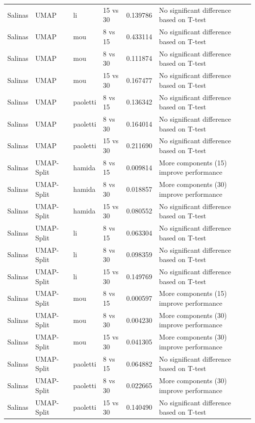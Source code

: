 \begin{longtable}{llllrl}
Salinas & UMAP & li & 15 vs 30 & 0.139786 & No significant difference based on T-test \\
Salinas & UMAP & mou & 8 vs 15 & 0.433114 & No significant difference based on T-test \\
Salinas & UMAP & mou & 8 vs 30 & 0.111874 & No significant difference based on T-test \\
Salinas & UMAP & mou & 15 vs 30 & 0.167477 & No significant difference based on T-test \\
Salinas & UMAP & paoletti & 8 vs 15 & 0.136342 & No significant difference based on T-test \\
Salinas & UMAP & paoletti & 8 vs 30 & 0.164014 & No significant difference based on T-test \\
Salinas & UMAP & paoletti & 15 vs 30 & 0.211690 & No significant difference based on T-test \\
Salinas & UMAP-Split & hamida & 8 vs 15 & 0.009814 & More components (15) improve performance \\
Salinas & UMAP-Split & hamida & 8 vs 30 & 0.018857 & More components (30) improve performance \\
Salinas & UMAP-Split & hamida & 15 vs 30 & 0.080552 & No significant difference based on T-test \\
Salinas & UMAP-Split & li & 8 vs 15 & 0.063304 & No significant difference based on T-test \\
Salinas & UMAP-Split & li & 8 vs 30 & 0.098359 & No significant difference based on T-test \\
Salinas & UMAP-Split & li & 15 vs 30 & 0.149769 & No significant difference based on T-test \\
Salinas & UMAP-Split & mou & 8 vs 15 & 0.000597 & More components (15) improve performance \\
Salinas & UMAP-Split & mou & 8 vs 30 & 0.004230 & More components (30) improve performance \\
Salinas & UMAP-Split & mou & 15 vs 30 & 0.041305 & More components (30) improve performance \\
Salinas & UMAP-Split & paoletti & 8 vs 15 & 0.064882 & No significant difference based on T-test \\
Salinas & UMAP-Split & paoletti & 8 vs 30 & 0.022665 & More components (30) improve performance \\
Salinas & UMAP-Split & paoletti & 15 vs 30 & 0.140490 & No significant difference based on T-test \\
\end{longtable}
